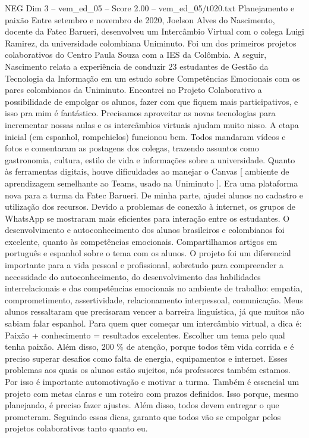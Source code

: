 \begin{textsample}{NEG Dim 3 – vem\_ed\_05 – Score 2.00 – vem\_ed\_05/t020.txt}  \label{ex:f3_neg_059}
Planejamento e paixão Entre setembro e novembro de 2020, Joelson Alves do Nascimento, docente da Fatec Barueri, desenvolveu um Intercâmbio Virtual com o colega Luigi Ramirez, da universidade colombiana Uniminuto.
Foi um dos primeiros projetos colaborativos do Centro Paula Souza com a IES da Colômbia.
A seguir, Nascimento relata a experiência de conduzir 23 estudantes de Gestão da Tecnologia da Informação em um estudo sobre Competências Emocionais com os pares colombianos da Uniminuto.
Encontrei no Projeto Colaborativo a possibilidade de empolgar os alunos, fazer com que fiquem mais participativos, e isso pra mim é fantástico.
Precisamos aproveitar as novas tecnologias para incrementar nossas aulas e os intercâmbios virtuais ajudam muito nisso.
A etapa inicial (em espanhol, rompehielos) funcionou bem.
Todos mandaram vídeos e fotos e comentaram as postagens dos colegas, trazendo assuntos como gastronomia, cultura, estilo de vida e informações sobre a universidade.
Quanto às ferramentas digitais, houve dificuldades ao manejar o Canvas [ ambiente de aprendizagem semelhante ao Teams, usado na Uniminuto ].
Era uma plataforma nova para a turma da Fatec Barueri.
De minha parte, ajudei alunos no cadastro e utilização dos recursos.
Devido a problemas de conexão à internet, os grupos de WhatsApp se mostraram mais eficientes para interação entre os estudantes.
O desenvolvimento e autoconhecimento dos alunos brasileiros e colombianos foi excelente, quanto às competências emocionais.
Compartilhamos artigos em português e espanhol sobre o tema com os alunos.
O projeto foi um diferencial importante para a vida pessoal e profissional, sobretudo para compreender a necessidade do autoconhecimento, do desenvolvimento das habilidades interrelacionais e das competências emocionais no ambiente de trabalho: empatia, comprometimento, assertividade, relacionamento interpessoal, comunicação.
Meus alunos ressaltaram que precisaram vencer a barreira linguística, já que muitos não sabiam falar espanhol.
Para quem quer começar um intercâmbio virtual, a dica é: Paixão + conhecimento = resultados excelentes.
Escolher um tema pelo qual tenha paixão.
Além disso, 200 \% de atenção, porque todos têm vida corrida e é preciso superar desafios como falta de energia, equipamentos e internet.
Esses problemas aos quais os alunos estão sujeitos, nós professores também estamos.
Por isso é importante automotivação e motivar a turma.
Também é essencial um projeto com metas claras e um roteiro com prazos definidos.
Isso porque, mesmo planejando, é preciso fazer ajustes.
Além disso, todos devem entregar o que prometeram.
Seguindo essas dicas, garanto que todos vão se empolgar pelos projetos colaborativos tanto quanto eu.

\end{textsample}
